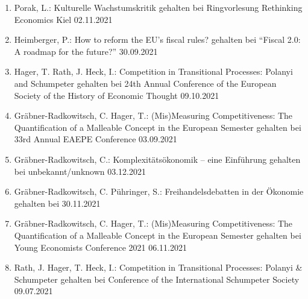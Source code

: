 \begin{enumerate}
	\item Porak, L.: Kulturelle Wachstumskritik gehalten bei Ringvorlesung Rethinking Economics Kiel 02.11.2021
	\item Heimberger, P.: How to reform the EU’s fiscal rules? gehalten bei “Fiscal 2.0: A roadmap for the future?” 30.09.2021
	\item Hager, T. Rath, J. Heck, I.: Competition in Transitional Processes: Polanyi and Schumpeter gehalten bei 24th Annual Conference of the European Society of the History of Economic Thought 09.10.2021
	\item Gräbner-Radkowitsch, C. Hager, T.: (Mis)Measuring Competitiveness: The Quantification of a Malleable Concept in the European Semester gehalten bei 33rd Annual EAEPE Conference 03.09.2021
	\item Gräbner-Radkowitsch, C.: Komplexitätsökonomik – eine Einführung gehalten bei unbekannt/unknown 03.12.2021
	\item Gräbner-Radkowitsch, C. Pühringer, S.: Freihandelsdebatten in der Ökonomie gehalten bei  30.11.2021
	\item Gräbner-Radkowitsch, C. Hager, T.: (Mis)Measuring Competitiveness: The Quantification of a Malleable Concept in the European Semester gehalten bei Young Economists Conference 2021 06.11.2021
	\item Rath, J. Hager, T. Heck, I.: Competition in Transitional Processes: Polanyi \& Schumpeter gehalten bei Conference of the International Schumpeter Society 09.07.2021
\end{enumerate}
